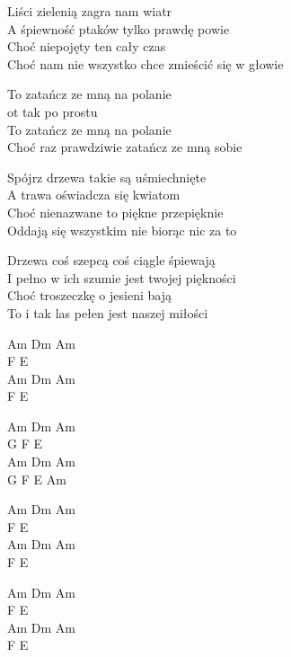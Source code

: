 \begin{text}
Liści zielenią zagra nam wiatr\\
A śpiewność ptaków tylko prawdę powie\\
Choć niepojęty ten cały czas\\
Choć nam nie wszystko chce zmieścić się w głowie

\vin To zatańcz ze mną na polanie\\
\vin ot tak po prostu\\
\vin To zatańcz ze mną na polanie\\
\vin Choć raz prawdziwie zatańcz ze mną sobie

Spójrz drzewa takie są uśmiechnięte\\
A trawa oświadcza się kwiatom\\
Choć nienazwane to piękne przepięknie\\
Oddają się wszystkim nie biorąc nic za to

Drzewa coś szepcą coś ciągle śpiewają\\
I pełno w ich szumie jest twojej piękności\\
Choć troszeczkę o jesieni bają\\
To i tak las pełen jest naszej miłości
\end{text}
\begin{chord}
Am Dm Am\\
F E\\
Am Dm Am\\
F E

Am Dm Am\\
G F E\\
Am Dm Am\\
G F E Am

Am Dm Am\\
F E\\
Am Dm Am\\
F E

Am Dm Am\\
F E\\
Am Dm Am\\
F E
\end{chord}
